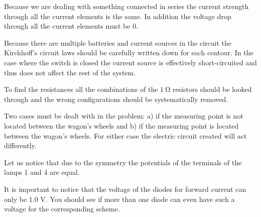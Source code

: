 \documentclass[11pt]{article}
\begin{document}

\hinteng
Because we are dealing with something connected in series the current strength through all the current elements is the same. In addition the voltage drop through all the current elements must be 0.
\probend
\bigskip


\hinteng
Because there are multiple batteries and current sources in the circuit the Kirchhoff's circuit laws should be carefully written down for each contour. In the case where the switch is closed the current source is effectively short-circuited and thus does not affect the rest of the system.
\probend
\bigskip


\hinteng
To find the resistances all the combinations of the $\SI{1}{\ohm}$ resistors should be looked through and the wrong configurations should be systematically removed.
\probend
\bigskip


\hinteng
Two cases must be dealt with in the problem: a) if the measuring point is not located between the wagon's wheels and b) if the measuring point is located between the wagon's wheels. For either case the electric circuit created will act differently.
\probend
\bigskip


\hinteng
Let us notice that due to the symmetry the potentials of the terminals of the lamps 1 and 4 are equal.
\probend
\bigskip


\hinteng
It is important to notice that the voltage of the diodes for forward current can only be 1.0 V. You should see if more than one diode can even have such a voltage for the corresponding scheme.
\probend
\bigskip
\end{document}
